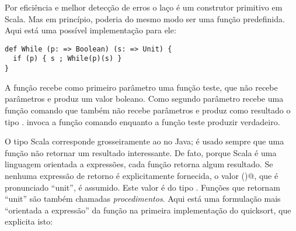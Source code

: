 Por eficiência e melhor detecção de erros o laço  é um construtor 
primitivo em Scala. Mas em princípio, poderia do mesmo modo ser uma função 
predefinida. Aqui está uma possível implementação para ele: 
\begin{lstlisting}
def While (p: => Boolean) (s: => Unit) {
  if (p) { s ; While(p)(s) }
}
\end{lstlisting}

A função  recebe como primeiro parâmetro uma função teste,
que não recebe parâmetros e produz um valor boleano. Como segundo parâmetro 
recebe uma função comando que também não recebe parâmetros e produz como 
resultado o tipo  \lstinline@Unit@.  invoca a função comando
enquanto a função teste produzir verdadeiro.

O tipo Scala \lstinline@Unit@ corresponde grosseiramente ao \lstinline@void@
no Java; é usado sempre que uma função não retornar um resultado interessante.
De fato, porque Scala é uma linguagem orientada a expressões, cada função 
retorna algum resultado. Se nenhuma expressão de retorno é  explicitamente
fornecida, o valor \lstinline@()@, que é pronunciado ``unit'', é assumido.
Este valor é do tipo \lstinline@Unit@. Funções que retornam ``unit'' são 
também chamadas {\em procedimentos}. Aqui está uma formulação mais 
``orientada a expressão'' da função \lstinline@swap@ na primeira implementação
do quicksort, que explicita isto:


